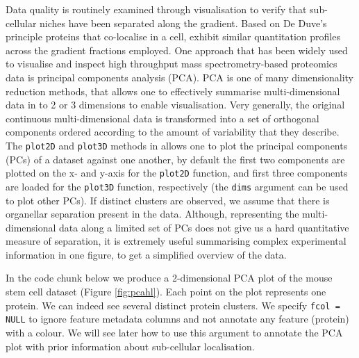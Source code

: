 Data quality is routinely examined through visualisation to verify
that sub-cellular niches have been separated along the gradient. Based
on De Duve's principle \cite{DeDuve:1981} proteins that co-localise in
a cell, exhibit similar quantitation profiles across the gradient
fractions employed. One approach that has been widely used to
visualise and inspect high throughput mass spectrometry-based
proteomics data is principal components analysis (PCA). PCA is one of
many dimensionality reduction methods, that allows one to effectively
summarise multi-dimensional data in to 2 or 3 dimensions to enable
visualisation. Very generally, the original continuous
multi-dimensional data is transformed into a set of orthogonal
components ordered according to the amount of variability that they
describe. The \texttt{plot2D} and \texttt{plot3D} methods in
 allows one to plot the principal components (PCs) of
a dataset against one another, by default the first two components are
plotted on the x- and y-axis for the \texttt{plot2D} function, and
first three components are loaded for the \texttt{plot3D} function,
respectively (the \texttt{dims} argument can be used to plot other
PCs). If distinct clusters are observed, we assume that there is
organellar separation present in the data. Although, representing the
multi-dimensional data along a limited set of PCs does not give us a
hard quantitative measure of separation, it is extremely useful
summarising complex experimental information in one figure, to get a
simplified overview of the data.

In the code chunk below we produce a 2-dimensional PCA plot of the
mouse stem cell dataset (Figure \ref{fig:pcahl}). Each point on the
plot represents one protein. We can indeed see several distinct
protein clusters. We specify \texttt{fcol = NULL} to ignore feature
metadata columns and not annotate any feature (protein) with a
colour. We will see later how to use this argument to annotate the PCA
plot with prior information about sub-cellular localisation.

